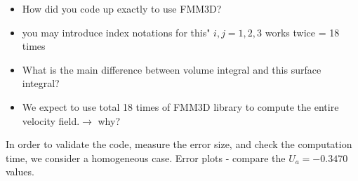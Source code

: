 \clearpage
\begin{itemize}
	\item How did you code up exactly to use FMM3D?
	\item you may introduce index notations for this"  $i,j = 1,2,3$ works twice = 18 times  
	\item What is the main difference between volume integral and this surface integral?
	\item {\color{red} We expect to use total 18 times of FMM3D library to compute the entire velocity field.$\rightarrow$ why?}
\end{itemize}
In order to validate the code, measure the error size, and check the computation time, we consider a homogeneous case.
Error plots - compare the $U_a = -0.3470$ values.
